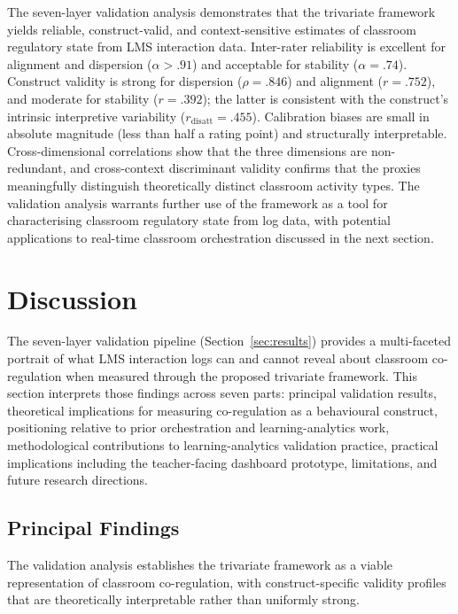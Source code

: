 \documentclass[preprint,12pt,authoryear]{elsarticle}
\begin{document}
The seven-layer validation analysis demonstrates that the trivariate framework yields reliable, construct-valid, and context-sensitive estimates of classroom regulatory state from LMS interaction data. Inter-rater reliability is excellent for alignment and dispersion ($\alpha > .91$) and acceptable for stability ($\alpha = .74$). Construct validity is strong for dispersion ($\rho = .846$) and alignment ($r = .752$), and moderate for stability ($r = .392$); the latter is consistent with the construct's intrinsic interpretive variability ($r_{\mathrm{disatt}} = .455$). Calibration biases are small in absolute magnitude (less than half a rating point) and structurally interpretable. Cross-dimensional correlations show that the three dimensions are non-redundant, and cross-context discriminant validity confirms that the proxies meaningfully distinguish theoretically distinct classroom activity types. The validation analysis warrants further use of the framework as a tool for characterising classroom regulatory state from log data, with potential applications to real-time classroom orchestration discussed in the next section.



\section{Discussion}
\label{sec:discussion}

The seven-layer validation pipeline (Section~\ref{sec:results}) provides a multi-faceted portrait of what LMS interaction logs can and cannot reveal about classroom co-regulation when measured through the proposed trivariate framework. This section interprets those findings across seven parts: principal validation results, theoretical implications for measuring co-regulation as a behavioural construct, positioning relative to prior orchestration and learning-analytics work, methodological contributions to learning-analytics validation practice, practical implications including the teacher-facing dashboard prototype, limitations, and future research directions.

\subsection{Principal Findings}
\label{sec:discuss_principal}

The validation analysis establishes the trivariate framework as a viable representation of classroom co-regulation, with construct-specific validity profiles that are theoretically interpretable rather than uniformly strong.
\end{document}
